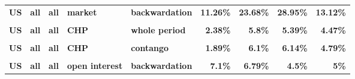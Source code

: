 \documentclass[
  authoryear,
  preprint,
  3p]{elsarticle}
\begin{document}
\begin{landscape}
\begin{longtable}[t]{>{}l>{}l>{}l>{}l>{}l>{}r>{}r>{}r>{}r}
\textbf{US} & \textbf{all} & \textbf{all} & \textbf{market} & \textbf{backwardation} & \textcolor[HTML]{4285f4}{\textbf{11.26\%}} & \textcolor[HTML]{4285f4}{\textbf{23.68\%}} & \textcolor[HTML]{4285f4}{\textbf{28.95\%}} & \textcolor[HTML]{4285f4}{\textbf{13.12\%}}\\
\textbf{\cellcolor{gray!10}{US}} & \textbf{\cellcolor{gray!10}{all}} & \textbf{\cellcolor{gray!10}{all}} & \textbf{\cellcolor{gray!10}{market}} & \textbf{\cellcolor{gray!10}{contango}} & \textcolor[HTML]{4285f4}{\textbf{\cellcolor{gray!10}{12.22\%}}} & \textcolor[HTML]{4285f4}{\textbf{\cellcolor{gray!10}{19.97\%}}} & \textcolor[HTML]{4285f4}{\textbf{\cellcolor{gray!10}{32.48\%}}} & \textcolor[HTML]{4285f4}{\textbf{\cellcolor{gray!10}{17.66\%}}}\\
\addlinespace
\textbf{US} & \textbf{all} & \textbf{all} & \textbf{CHP} & \textbf{whole period} & \textcolor[HTML]{4285f4}{\textbf{2.38\%}} & \textcolor[HTML]{4285f4}{\textbf{5.8\%}} & \textcolor[HTML]{4285f4}{\textbf{5.39\%}} & \textcolor[HTML]{4285f4}{\textbf{4.47\%}}\\
\textbf{\cellcolor{gray!10}{US}} & \textbf{\cellcolor{gray!10}{all}} & \textbf{\cellcolor{gray!10}{all}} & \textbf{\cellcolor{gray!10}{CHP}} & \textbf{\cellcolor{gray!10}{backwardation}} & \textcolor[HTML]{4285f4}{\textbf{\cellcolor{gray!10}{3.19\%}}} & \textcolor[HTML]{4285f4}{\textbf{\cellcolor{gray!10}{5.94\%}}} & \textcolor[HTML]{4285f4}{\textbf{\cellcolor{gray!10}{4.72\%}}} & \textcolor[HTML]{4285f4}{\textbf{\cellcolor{gray!10}{5.54\%}}}\\
\textbf{US} & \textbf{all} & \textbf{all} & \textbf{CHP} & \textbf{contango} & \textcolor[HTML]{4285f4}{\textbf{1.89\%}} & \textcolor[HTML]{4285f4}{\textbf{6.1\%}} & \textcolor[HTML]{4285f4}{\textbf{6.14\%}} & \textcolor[HTML]{4285f4}{\textbf{4.79\%}}\\
\textbf{\cellcolor{gray!10}{US}} & \textbf{\cellcolor{gray!10}{all}} & \textbf{\cellcolor{gray!10}{all}} & \textbf{\cellcolor{gray!10}{open interest}} & \textbf{\cellcolor{gray!10}{whole period}} & \textcolor[HTML]{4285f4}{\textbf{\cellcolor{gray!10}{7.45\%}}} & \textcolor[HTML]{4285f4}{\textbf{\cellcolor{gray!10}{6.95\%}}} & \textcolor[HTML]{4285f4}{\textbf{\cellcolor{gray!10}{4.57\%}}} & \textcolor[HTML]{4285f4}{\textbf{\cellcolor{gray!10}{5.29\%}}}\\
\textbf{US} & \textbf{all} & \textbf{all} & \textbf{open interest} & \textbf{backwardation} & \textcolor[HTML]{4285f4}{\textbf{7.1\%}} & \textcolor[HTML]{4285f4}{\textbf{6.79\%}} & \textcolor[HTML]{4285f4}{\textbf{4.5\%}} & \textcolor[HTML]{4285f4}{\textbf{5\%}}\\

\end{longtable}
\end{landscape}
\end{document}
